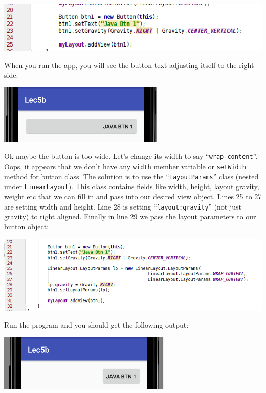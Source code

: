 \begin{center}
	\includegraphics[scale=0.4]{chapters/ch05/images/22}
\end{center}

When you run the app, you will see the button text adjusting itself to the right side:

\begin{center}
	\includegraphics[scale=0.4]{chapters/ch05/images/23}
\end{center}

Ok maybe the button is too wide. Let's change its width to say ``\texttt{wrap\_content}''. Oops, it appears that we don't have any \texttt{width} member variable or \texttt{setWidth} method for button class. The solution is to use the ``\texttt{LayoutParams}'' class (nested under \texttt{LinearLayout}). This class contains fields like width, height, layout gravity, weight etc that we can fill in and pass into our desired view object. Lines 25 to 27 are setting width and height. Line 28 is setting ``\texttt{layout:gravity}'' (not just gravity) to right aligned. Finally in line 29 we pass the layout parameters to our button object:

\begin{center}
	\includegraphics[scale=0.4]{chapters/ch05/images/24}
\end{center}

Run the program and you should get the following output:

\begin{center}
	\includegraphics[scale=0.4]{chapters/ch05/images/25}
\end{center}

